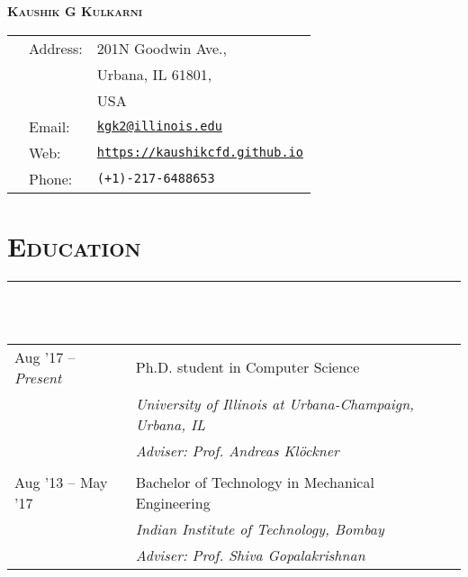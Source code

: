 \documentclass[letterpaper, 12pt]{article}
\begin{document}

\begin{center}
    \LARGE
    \textsc{\textbf{
    Kaushik G Kulkarni}}\\
    \vspace{1ex}
    \normalsize
    \begin{tabular}{p{}p{8ex} p{}}
        & Address:    & 201N Goodwin Ave.,\\
        &             & Urbana, IL 61801,\\
        &             & USA\\
        & Email:      &\href{mailto:kgk2@illinois.edu}{\texttt{kgk2@illinois.edu}}\\
        & Web:        & \texttt{\small \url{https://kaushikcfd.github.io}} \\
        & Phone:      &\texttt{(+1)-217-6488653}
    \end{tabular}
\end{center}



\section*{\Large\textsc{Education}}
\vspace{-4ex}
\rule{\textwidth}{0.1ex}\\
\vspace{1ex}\\
\begin{tabular}{p{} p{}}
Aug '17 --  \textit{Present}  & Ph.D. student in Computer Science \\
                              & \textit{University of Illinois at Urbana-Champaign, Urbana, IL} \\
                              & \textit{Adviser: Prof. Andreas Kl\"{o}ckner} \\
                              & \\
Aug '13 -- May '17            & Bachelor of Technology in Mechanical Engineering \\
                              & \textit{Indian Institute of Technology, Bombay} \\
                              & \textit{Adviser: Prof. Shiva Gopalakrishnan}\\
\end{tabular}

\end{document}
